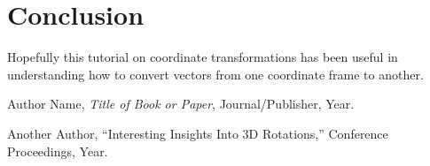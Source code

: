 \documentclass[11pt]{article}
\begin{document}
\section{Conclusion}
\label{sec:conclusion}

Hopefully this tutorial on coordinate transformations has been useful in understanding
how to convert vectors from one coordinate frame to another.
\begin{thebibliography}{99}

Author Name, \emph{Title of Book or Paper}, Journal/Publisher, Year.

Another Author, ``Interesting Insights Into 3D Rotations,'' Conference Proceedings, Year.


\end{thebibliography}
\end{document}
